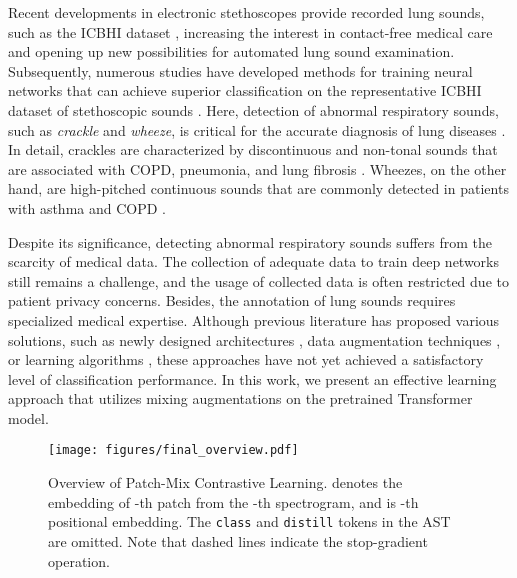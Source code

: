 \documentclass{INTERSPEECH2023}
\begin{document}
Recent developments in electronic stethoscopes provide recorded lung sounds, such as the ICBHI dataset \cite{rocha2018alpha}, increasing the interest in contact-free medical care and opening up new possibilities for automated lung sound examination.
Subsequently, numerous studies have developed methods for training neural networks that can achieve superior classification on the representative ICBHI dataset of stethoscopic sounds  \cite{ma2020lungrn+,yang2020adventitious, gairola2021respirenet, nguyen2022lung}.
Here, detection of abnormal respiratory sounds, such as \textit{crackle} and \textit{wheeze}, is critical for the accurate diagnosis of lung diseases \cite{bohadana2014fundamentals}.
In detail, crackles are characterized by discontinuous and non-tonal sounds that are associated with COPD, pneumonia, and lung fibrosis \cite{flietstra2011automated}.
Wheezes, on the other hand, are high-pitched continuous sounds that are commonly detected in patients with asthma and COPD \cite{bohadana2014fundamentals, reichert2008analysis}. 






Despite its significance, detecting abnormal respiratory sounds suffers from the scarcity of medical data. 
The collection of adequate data to train deep networks still remains a challenge, and the usage of collected data is often restricted due to patient privacy concerns. Besides, the annotation of lung sounds requires specialized medical expertise.
Although previous literature has proposed various solutions, such as newly designed architectures \cite{ma2020lungrn+, nguyen2022lung, ma2019lungbrn}, data augmentation techniques \cite{ma2020lungrn+, gairola2021respirenet, wang2022domain}, or learning algorithms \cite{gairola2021respirenet, nguyen2022lung, moummad2022supervised}, these approaches have not yet achieved a satisfactory level of classification performance.
In this work, we present an effective learning approach that utilizes mixing augmentations on the pretrained Transformer model.


\begin{figure}[!t]
    \vspace{-2.5pt}
    \centering
    \texttt{[image: figures/final\_overview.pdf]}
    \vspace{-5pt}
    \caption{Overview of Patch-Mix Contrastive Learning.  denotes the embedding of -th patch from the -th spectrogram, and  is -th positional embedding. The \texttt{class} and \texttt{distill} tokens in the AST are omitted. Note that dashed lines indicate the stop-gradient operation.}
    \label{fig:overview}
    \vspace{-12pt}
\end{figure}
\end{document}
